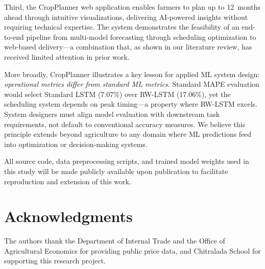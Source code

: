 \documentclass[journal]{IEEEtran}
\begin{document}
Third, the CropPlanner web application enables farmers to plan up to 12~months ahead through intuitive visualizations, delivering AI-powered insights without requiring technical expertise. The system demonstrates the feasibility of an end-to-end pipeline from multi-model forecasting through scheduling optimization to web-based delivery---a combination that, as shown in our literature review, has received limited attention in prior work.

More broadly, CropPlanner illustrates a key lesson for applied ML system design: \textit{operational metrics differ from standard ML metrics}. Standard MAPE evaluation would select Standard LSTM (7.07\%) over RW-LSTM (17.06\%), yet the scheduling system depends on peak timing---a property where RW-LSTM excels. System designers must align model evaluation with downstream task requirements, not default to conventional accuracy measures. We believe this principle extends beyond agriculture to any domain where ML predictions feed into optimization or decision-making systems.

All source code, data preprocessing scripts, and trained model weights used in this study will be made publicly available upon publication to facilitate reproduction and extension of this work.

\section*{Acknowledgments}

The authors thank the Department of Internal Trade and the Office of Agricultural Economics for providing public price data, and Chitralada School for supporting this research project.
\end{document}
